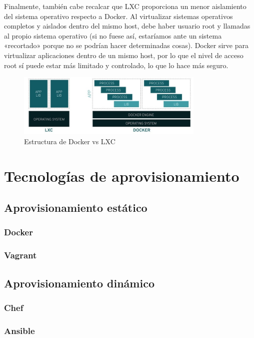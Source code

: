 Finalmente, también cabe recalcar que LXC proporciona un menor aislamiento del sistema operativo respecto a Docker. Al virtualizar sistemas operativos completos y aislados dentro del mismo host, debe haber usuario root y llamadas al propio sistema operativo (si no fuese así, estaríamos ante un sistema «recortado» porque no se podrían hacer determinadas cosas). Docker sirve para virtualizar aplicaciones dentro de un mismo host, por lo que el nivel de acceso root sí puede estar más limitado y controlado, lo que lo hace más seguro.

\vspace{0.2cm}
\begin{figure}[h]
\centering
\includegraphics[width=0.8\textwidth]{../imgs/EdA/LXCvsDocker.jpg}
\caption{Estructura de Docker vs LXC}
\label{fig:docker-life}
\end{figure}
\clearpage

\section{Tecnologías de aprovisionamiento} \label{ch:aprov}
\subsection{Aprovisionamiento estático} \label{sec:est}
\subsubsection{Docker}
\subsubsection{Vagrant}
\subsection{Aprovisionamiento dinámico} \label{sec:din}
\subsubsection{Chef}
\subsubsection{Ansible}
